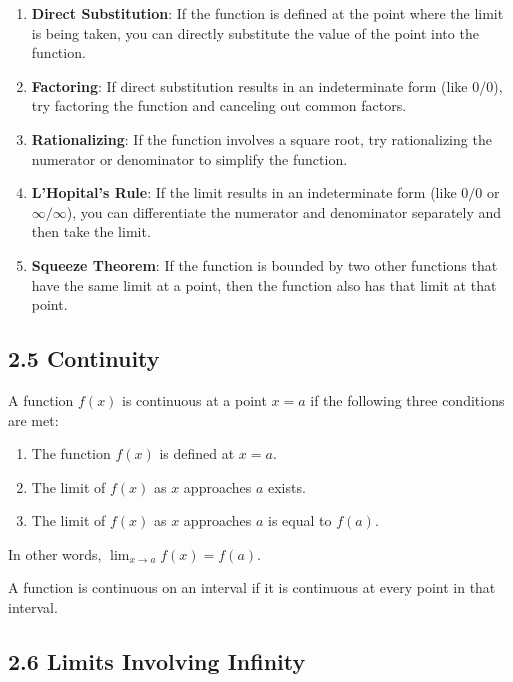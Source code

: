 \documentclass{article}
\begin{document}
\begin{enumerate}
\item \textbf{Direct Substitution}: If the function is defined at the point where the limit is being taken, you can directly substitute the value of the point into the function.

\item \textbf{Factoring}: If direct substitution results in an indeterminate form (like 0/0), try factoring the function and canceling out common factors.

\item \textbf{Rationalizing}: If the function involves a square root, try rationalizing the numerator or denominator to simplify the function.

\item \textbf{L'Hopital's Rule}: If the limit results in an indeterminate form (like $0/0$ or $\infty/\infty$), you can differentiate the numerator and denominator separately and then take the limit.

\item \textbf{Squeeze Theorem}: If the function is bounded by two other functions that have the same limit at a point, then the function also has that limit at that point.
\end{enumerate}

\subsection{2.5 Continuity}
A  function \(f(x)\) is continuous at a point \(x = a\) if the following three conditions are met:

\begin{enumerate}
\item The function \(f(x)\) is defined at \(x = a\).
\item The limit of \(f(x)\) as \(x\) approaches \(a\) exists.
\item The limit of \(f(x)\) as \(x\) approaches \(a\) is equal to \(f(a)\).
\end{enumerate}

In other words, \(\lim_{x \to a} f(x) = f(a)\).

A function is continuous on an interval if it is continuous at every point in that interval.

\subsection{2.6 Limits Involving Infinity}
\end{document}
